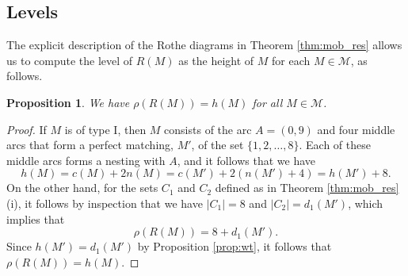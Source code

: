\documentclass[11pt]{amsart}
\theoremstyle{plain}
\newtheorem{prop}[theorem]{Proposition}
\theoremstyle{definition}
\theoremstyle{remark}
\numberwithin{equation}{section}
\newcommand{\calm}{\mathcal{M}}
\newcommand{\abs}[1]{\lvert #1 \rvert}
\begin{document}
\subsection{Levels}
\label{sec:mob_level}

The explicit description of the Rothe diagrams in Theorem \ref{thm:mob_res}
allows us to compute the level of $R(M)$ as the height of $M$ for each $M\in
\calm$, as follows.

\begin{prop}
\label{prop:mob_level}
We have $\rho(R(M))=h(M)$ for all $M\in \calm$.
\end{prop}

\begin{proof}
If $M$ is of type I, then $M$ consists of the arc $A=(0,9)$ and four middle arcs
that form a perfect matching, $M'$, of 
the set $\{1,2,\dots, 8\}$. Each of these middle arcs forms a nesting with $A$,
and it follows that we have 
\[
h(M)=c(M)+2n(M)=c(M')+2(n(M')+4)=h(M')+8.
\]
On the other hand, for the sets $C_1$ and $C_2$ defined as in Theorem
\ref{thm:mob_res} (i), it follows by inspection that we have
$\abs{C_1}=8$ and $\abs{C_2}=d_1(M')$, which implies that
\[
\rho(R(M))= 8 + d_1(M').
\]
Since $h(M')=d_1(M')$ by Proposition \ref{prop:wt},  it follows that
$\rho(R(M))=h(M)$.


\end{proof}
\end{document}
